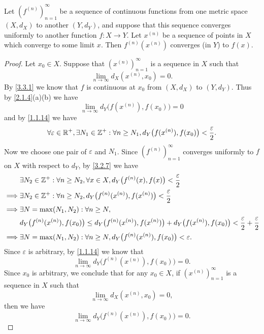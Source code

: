 \begin{prop}\label{3.3.4}
  Let \((f^{(n)})_{n = 1}^\infty\) be a sequence of continuous functions from one metric space \((X, d_X)\) to another \((Y, d_Y)\), and suppose that this sequence converges uniformly to another function \(f : X \to Y\).
  Let \(x^{(n)}\) be a sequence of points in \(X\) which converge to some limit \(x\).
  Then \(f^{(n)}(x^{(n)})\) converges (in \(Y\)) to \(f(x)\).
\end{prop}

\begin{proof}
  Let \(x_0 \in X\).
  Suppose that \((x^{(n)})_{n = 1}^\infty\) is a sequence in \(X\) such that
  \[
    \lim_{n \to \infty} d_X(x^{(n)}, x_0) = 0.
  \]
  By \cref{3.3.1} we know that \(f\) is continuous at \(x_0\) from \((X, d_X)\) to \((Y, d_Y)\).
  Thus by \cref{2.1.4}(a)(b) we have
  \[
    \lim_{n \to \infty} d_Y\big(f(x^{(n)}), f(x_0)\big) = 0
  \]
  and by \cref{1.1.14} we have
  \[
    \forall \varepsilon \in \mathbb{R}^+, \exists N_1 \in \mathbb{Z}^+ : \forall n \geq N_1, d_Y\big(f(x^{(n)}), f(x_0)\big) < \dfrac{\varepsilon}{2}.
  \]
  Now we choose one pair of \(\varepsilon\) and \(N_1\).
  Since \((f^{(n)})_{n = 1}^\infty\) converges uniformly to \(f\) on \(X\) with respect to \(d_Y\), by \cref{3.2.7} we have
  \begin{align*}
             & \exists N_2 \in \mathbb{Z}^+ : \forall n \geq N_2, \forall x \in X, d_Y\big(f^{(n)}(x), f(x)\big) < \dfrac{\varepsilon}{2}                                                       \\
    \implies & \exists N_2 \in \mathbb{Z}^+ : \forall n \geq N_2, d_Y\big(f^{(n)}(x^{(n)}), f(x^{(n)})\big) < \dfrac{\varepsilon}{2}                                                            \\
    \implies & \exists N = \max(N_1, N_2) : \forall n \geq N,                                                                                                                           \\
             & d_Y\big(f^{(n)}(x^{(n)}), f(x_0)\big) \leq d_Y\big(f^{(n)}(x^{(n)}), f(x^{(n)})\big) + d_Y\big(f(x^{(n)}), f(x_0)\big) < \dfrac{\varepsilon}{2} + \dfrac{\varepsilon}{2} \\
    \implies & \exists N = \max(N_1, N_2) : \forall n \geq N, d_Y\big(f^{(n)}(x^{(n)}), f(x_0)\big) < \varepsilon.
  \end{align*}
  Since \(\varepsilon\) is arbitrary, by \cref{1.1.14} we know that
  \[
    \lim_{n \to \infty} d_Y\big(f^{(n)}(x^{(n)}), f(x_0)\big) = 0.
  \]
  Since \(x_0\) is arbitrary, we conclude that for any \(x_0 \in X\), if \((x^{(n)})_{n = 1}^\infty\) is a sequence in \(X\) such that
  \[
    \lim_{n \to \infty} d_X(x^{(n)}, x_0) = 0,
  \]
  then we have
  \[
    \lim_{n \to \infty} d_Y\big(f^{(n)}(x^{(n)}), f(x_0)\big) = 0.
  \]
\end{proof}

